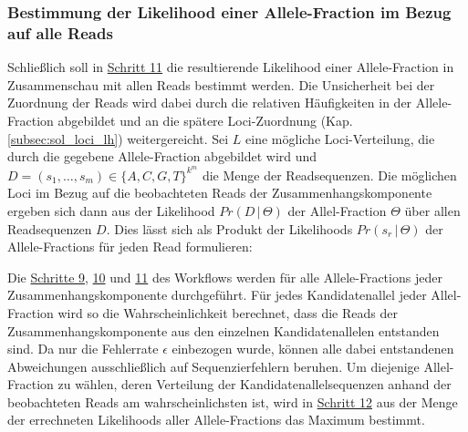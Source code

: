 \subsubsection{Bestimmung der Likelihood einer Allele-Fraction im Bezug auf alle Reads} \label{sol_vaf_all_reads}

Schließlich soll in \hyperref[step11]{Schritt 11\label{step11txt}} die resultierende Likelihood einer Allele-Fraction in Zusammenschau mit allen Reads bestimmt werden. Die Unsicherheit bei der Zuordnung der Reads wird dabei durch die relativen Häufigkeiten in der Allele-Fraction abgebildet und an die spätere Loci-Zuordnung (Kap. \ref{subsec:sol_loci_lh}) weitergereicht. Sei $L$ eine mögliche Loci-Verteilung, die durch die gegebene Allele-Fraction abgebildet wird und $D = (s_{1}, \dots, s_{m}) \in \{A,C, G, T\}^{k^m}$ die Menge der Readsequenzen. Die möglichen Loci im Bezug auf die beobachteten Reads der Zusammenhangskomponente ergeben sich dann aus der Likelihood $Pr(D \, | \, \Theta)$ der Allel-Fraction $\Theta$ über allen Readsequenzen $D$. Dies lässt sich als Produkt der Likelihoods $Pr(s_{r} \, | \, \Theta)$ der Allele-Fractions für jeden Read formulieren: 
\vspace{-0.5cm}
\begin{center}
\end{center}

Die \hyperref[step9]{Schritte 9}, \hyperref[step10]{10} und \hyperref[step11]{11} des Workflows werden für alle Allele-Fractions jeder Zusammenhangskomponente durchgeführt. Für jedes Kandidatenallel jeder Allel-Fraction wird so die Wahrscheinlichkeit berechnet, dass die Reads der Zusammenhangskomponente aus den einzelnen Kandidatenallelen entstanden sind. Da nur die Fehlerrate $\epsilon$ einbezogen wurde, können alle dabei entstandenen Abweichungen ausschließlich auf Sequenzierfehlern beruhen. Um diejenige Allel-Fraction zu wählen, deren Verteilung der Kandidatenallelsequenzen anhand der beobachteten Reads am wahrscheinlichsten ist, wird in \hyperref[step12]{Schritt 12\label{step12txt}} aus der Menge der errechneten Likelihoods aller Allele-Fractions das Maximum bestimmt.  

